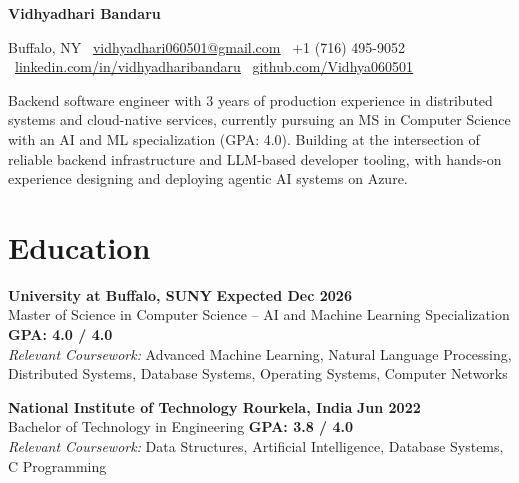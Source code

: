 \documentclass[10pt,letterpaper]{article}
\begin{document}
\raggedbottom
\fontsize{8.7}{9.85}\selectfont
{\centering
{\fontsize{20}{21}\selectfont\bfseries Vidhyadhari Bandaru\par}
\vspace{2pt}
Buffalo, NY \textbar\
\href{mailto:vidhyadhari060501@gmail.com}
{\uline{vidhyadhari060501@gmail.com}} \textbar\
+1 (716) 495-9052 \textbar\
\href{https://www.linkedin.com/in/vidhyadharibandaru}
{\uline{linkedin.com/in/vidhyadharibandaru}} \textbar\
\href{https://github.com/Vidhya060501}
{\uline{github.com/Vidhya060501}}\par
\vspace{1.2pt}
}
\vspace{1pt}

{\fontsize{8.7}{10}\selectfont
Backend software engineer with 3 years of production experience in distributed systems and cloud-native services, currently pursuing an MS in Computer Science with an AI and ML specialization (GPA: 4.0). Building at the intersection of reliable backend infrastructure and LLM-based developer tooling, with hands-on experience designing and deploying agentic AI systems on Azure.
\par}
\vspace{3pt}

\section*{Education}
\textbf{University at Buffalo, SUNY}
\hfill \textbf{Expected Dec 2026}\\
Master of Science in Computer Science -- AI and Machine Learning Specialization
\hfill \textbf{GPA: 4.0 / 4.0}\\
\textit{Relevant Coursework:}
Advanced Machine Learning, Natural Language Processing, Distributed Systems,
Database Systems, Operating Systems, Computer Networks
\vspace{2pt}

\textbf{National Institute of Technology Rourkela, India}
\hfill \textbf{Jun 2022}\\
Bachelor of Technology in Engineering
\hfill \textbf{GPA: 3.8 / 4.0}\\
\textit{Relevant Coursework:}
Data Structures, Artificial Intelligence, Database Systems, C Programming
\vspace{2pt}
\end{document}
